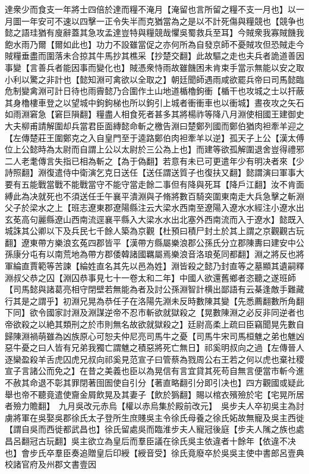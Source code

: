達衆少而食支一年將士四倍於達而糧不淹月【淹留也言所留之糧不支一月也】以一月圖一年安可不速以四擊一正令失半而克猶當為之是以不計死傷與糧競也【競争也懿之語珪猶有廋辭蓋其急攻孟達豈特與糧競哉懼吳蜀救兵至耳】今賊衆我寡賊饑我飽水雨乃爾【爾如此也】功力不設雖當促之亦何所為自發京師不憂賊攻但恐賊走今賊糧垂盡而圍落未合掠其牛馬抄其樵采【抄楚交翻】此故驅之走也夫兵者詭道善因事變【言善兵者能因事而變化也】賊憑衆恃雨故雖饑困未肯束手當示無能以安之取小利以驚之非計也【懿知淵可禽欲以全取之】朝廷聞師遇雨咸欲罷兵帝曰司馬懿臨危制變禽淵可計日待也雨霽懿乃合圍作土山地道楯櫓鉤衝【楯干也攻城之士以扞蔽其身櫓樓車登之以望城中鉤鉤梯也所以鉤引上城者衝衝車也以衝城】晝夜攻之矢石如雨淵窘急【窘巨隕翻】糧盡人相食死者甚多其將楊祚等降八月淵使相國王建御史大夫柳甫請解圍却兵當君臣面縳懿命斬之檄告淵曰楚鄭列國而鄭伯猶肉袒牽羊迎之【左傳楚莊王圍鄭克之入自皇門至于逵路鄭伯肉袒牽羊以逆】孤天子上公【漢太傅位上公懿時為太尉而自謂上公以太尉於三公為上也】而建等欲孤解圍退舍豈得禮邪二人老耄傳言失指已相為斬之【為于偽翻】若意有未已可更遣年少有明决者來【少詩照翻】淵復遣侍中衛演乞克日送任【送任謂送質子也復扶又翻】懿謂演曰軍事大要有五能戰當戰不能戰當守不能守當走餘二事但有降與死耳【降戶江翻】汝不肯面縛此為决就死也不須送任壬午襄平潰淵與子脩將數百騎突圍東南走大兵急擊之斬淵父子於梁水之上【班志遼東郡遼陽縣注云大梁水西南至遼陽入遼水水經注小遼水出玄莬高句麗縣遼山西南流逕襄平縣入大梁水水出北塞外西南流而入于遼水】懿既入城誅其公卿以下及兵民七千餘人築為京觀【杜預曰積尸封土於其上謂之京觀觀古玩翻】遼東帶方樂浪玄菟四郡皆平【漢帶方縣屬樂浪郡公孫氏分立郡陳夀曰建安中公孫康分屯有以南荒地為帶方郡倭韓諸國羈屬焉樂浪音洛琅莬同都翻】淵之將反也將軍綸直賈範等苦諫【綸姓直名其先以邑為姓】淵皆殺之懿乃封直等之墓顯其遺嗣釋淵叔父恭之囚【淵囚恭事見七十一卷太和二年】中國人欲還舊鄉者恣聽之遂班師【司馬懿與諸葛亮相守閉壁若無能為者及討公孫淵智計横出鄙語有云棊逢敵手難藏行其是之謂乎】初淵兄晃為恭任子在洛陽先淵未反時數陳其變【先悉薦翻數所角翻下同】欲令國家討淵及淵謀逆帝不忍市斬欲就獄殺之【晃數陳淵之必反非同逆者也帝欲殺之以絶其類刑之於市則無名故欲就獄殺之】廷尉高柔上疏曰臣竊聞晃先數自歸陳淵禍萌雖為凶族原心可恕夫仲尼亮司馬牛之憂【司馬牛宋司馬桓魋之弟也魋凶惡牛憂之曰人皆有兄弟我獨亡謂魋之積惡將死亡無日】祁奚明叔向之過【左傳晉人逐欒盈殺羊舌虎囚虎兄叔向祁奚見范宣子曰管蔡為戮周公右王若之何以虎也棄社稷宣子言諸公而免之】在昔之美義也臣以為晃信有言宜貸其死苟自無言便當市斬今進不赦其命退不彰其罪閉著囹圄使自引分【著直略翻引分即引决也】四方觀國或疑此舉也帝不聽竟遣使齎金屑飲晃及其妻子【飲於㺔翻】賜以棺衣殯殮於宅【宅晃所居者殮力贍翻】　九月吳改元赤烏【權以赤烏集於殿前改元】　吳步夫人卒初吳主為討虜將軍在吳娶吳郡徐氏太子登所生庶賤吳主令徐氏母養之徐氏妬故無寵及吳主西徙【謂自吳而西徙都武昌也】徐氏留處吳而臨淮步夫人寵冠後庭【步夫人隲之族也處昌呂翻冠古玩翻】吳主欲立為皇后而羣臣議在徐氏吳主依違者十餘年【依違不决也】會步氏卒羣臣奏追贈皇后印綬【綬音受】徐氏竟廢卒於吳吳主使中書郎呂壹典校諸官府及州郡文書壹因

